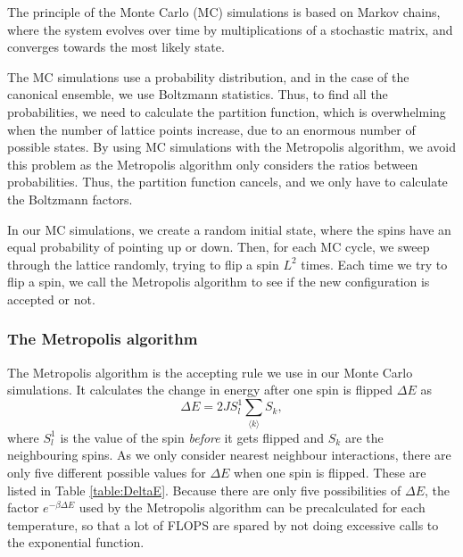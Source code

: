 \documentclass[%
 reprint,
nofootinbib,
aps,
]{revtex4-1}
\begin{document}
The principle of the Monte Carlo (MC) simulations is based on Markov chains, where the system evolves over time by multiplications of a stochastic matrix, and converges towards the most likely state.

The MC simulations use a probability distribution, and in the case of the canonical ensemble, we use Boltzmann statistics. Thus, to find all the probabilities, we need to calculate the partition function, which is overwhelming when the number of lattice points increase, due to an enormous number of possible states. By using MC simulations with the Metropolis algorithm, we avoid this problem as the Metropolis algorithm only considers the ratios between probabilities. Thus, the partition function cancels, and we only have to calculate the Boltzmann factors.

In our MC simulations, we create a random initial state, where the spins have an equal probability of pointing up or down. Then, for each MC cycle, we sweep through the lattice randomly, trying to flip a spin $L^2$ times. Each time we try to flip a spin, we call the Metropolis algorithm to see if the new configuration is accepted or not.

\subsubsection{The Metropolis algorithm}

The Metropolis algorithm is the accepting rule we use in our Monte Carlo simulations. It calculates the change in energy after one spin is flipped $\Delta E$ as
\begin{equation}
\Delta E = 2JS^1_l\sum_{\langle k \rangle}S_k,
\end{equation}
where $S^1_l$ is the value of the spin \textit{before} it gets flipped and $S_k$ are the neighbouring spins. As we only consider nearest neighbour interactions, there are only five different possible values for $\Delta E$ when one spin is flipped. These are listed in Table \ref{table:DeltaE}. Because there are only five possibilities of $\Delta E$, the factor $e^{-\beta\Delta E}$ used by the Metropolis algorithm can be precalculated for each temperature, so that a lot of FLOPS are spared by not doing excessive calls to the exponential function.
\end{document}
